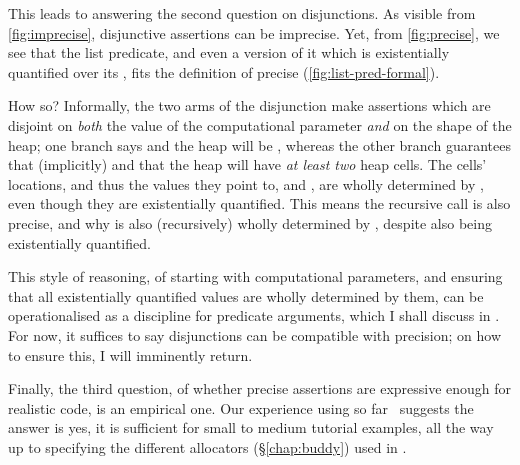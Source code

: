 This leads to answering the second question on disjunctions. As visible from
\cref{fig:imprecise}, disjunctive assertions can be imprecise. Yet, from
\cref{fig:precise}, we see that the list predicate, and even a version of it
which is existentially quantified over its , fits the definition of
precise (\cref{fig:list-pred-formal}).

\begin{marginfigure}
\small%
\caption{Examples of im assertions.}\label{fig:imprecise}
\end{marginfigure}

How so? Informally, the two arms of the disjunction make assertions which are
disjoint on \emph{both} the value of the computational parameter 
\emph{and} on the shape of the heap; one branch says  and the heap will be , whereas the other branch
guarantees that (implicitly)  and that the heap
will have \emph{at least two} heap cells. The cells' locations, and thus the
values they point to,  and , are wholly
determined by , even though they are existentially quantified. This
means the recursive call is also precise, and why  is also (recursively)
wholly determined by , despite also being existentially quantified.

This style of reasoning, of starting with computational parameters, and
ensuring that all existentially quantified values are wholly determined by
them, can be operationalised as a  discipline for predicate arguments,
which I shall discuss in . For now, it suffices to
say disjunctions can be compatible with precision; on how to ensure this, I
will imminently return.

Finally, the third question, of whether precise assertions are expressive
enough for realistic code, is an empirical one. Our experience using  so
far~ suggests the answer
is yes, it is sufficient for small to medium tutorial examples, all the way up
to specifying the different allocators (\S\ref{chap:buddy}) used in \@.

